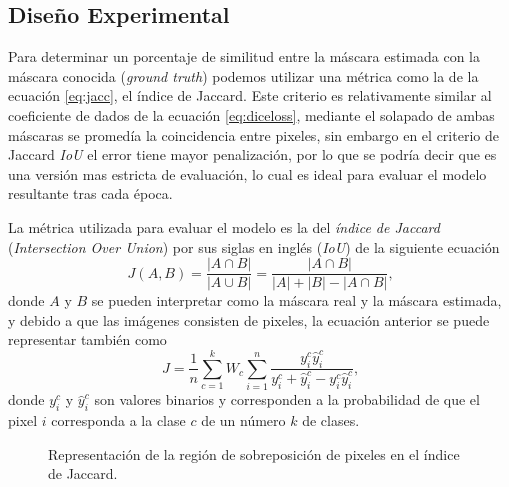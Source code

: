 \subsection{Diseño Experimental}
Para determinar un porcentaje de similitud entre la máscara estimada con la máscara conocida (\emph{ground truth}) podemos utilizar una métrica como la de la ecuación \ref{eq:jacc}, el índice de Jaccard. Este criterio es relativamente similar al coeficiente de dados de la ecuación \ref{eq:diceloss}, mediante el solapado de ambas máscaras se promedía la coincidencia entre pixeles, sin embargo en el criterio de Jaccard \emph{IoU} el error tiene mayor penalización, por lo que se podría decir que es una versión mas estricta de evaluación, lo cual es ideal para evaluar el modelo resultante tras cada época.

La métrica utilizada para evaluar el modelo es la del \emph{índice de Jaccard} (\emph{Intersection Over Union}) por sus siglas en inglés (\emph{IoU}) \citep{fpn_1} de la siguiente ecuación
\begin{equation}\label{eq:jacc}
    J(A,B) = \frac{|A \cap B|}{| A \cup B |} = \frac{|A \cap B|}{|A| + |B| - |A \cap B|} \text{,}
\end{equation} 
donde $A$ y $B$ se pueden interpretar como la máscara real y la máscara estimada, y debido a que las imágenes consisten de pixeles, la ecuación anterior se puede representar también como
\begin{equation}
    J = \frac{1}{n} \sum_{c=1}^{k} W_c \sum_{i=1}^{n}\frac{y_i^c \hat y_i^c}{y_i^c + \hat y_i^c - y_i^c \hat y_i^c} \text{,}
\end{equation} 
donde $y_i^c$ y $\hat y_i^c$ son valores binarios y corresponden a la probabilidad de que el pixel $i$ corresponda a la clase $c$ de un número $k$ de clases.

\def\rectA{(0,0) rectangle (2,2)}
\def\rectB{(1,-1) rectangle (3,1)}

\begin{figure}[h!]
    \centering
    \caption{Representación de la región de sobreposición de pixeles en el índice de Jaccard.}
    \label{fig:jacc_inter}
\end{figure}

